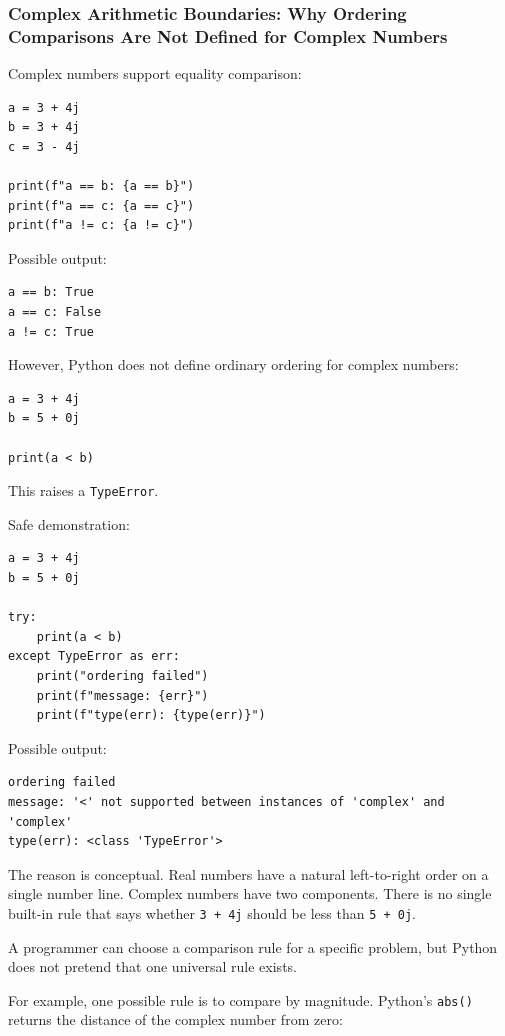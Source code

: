 \subsubsection{Complex Arithmetic Boundaries: Why Ordering Comparisons Are Not Defined for Complex Numbers}

Complex numbers support equality comparison:

\begin{verbatim}
a = 3 + 4j
b = 3 + 4j
c = 3 - 4j

print(f"a == b: {a == b}")
print(f"a == c: {a == c}")
print(f"a != c: {a != c}")
\end{verbatim}

Possible output:

\begin{verbatim}
a == b: True
a == c: False
a != c: True
\end{verbatim}

However, Python does not define ordinary ordering for complex numbers:

\begin{verbatim}
a = 3 + 4j
b = 5 + 0j

print(a < b)
\end{verbatim}

This raises a \texttt{TypeError}.

Safe demonstration:

\begin{verbatim}
a = 3 + 4j
b = 5 + 0j

try:
    print(a < b)
except TypeError as err:
    print("ordering failed")
    print(f"message: {err}")
    print(f"type(err): {type(err)}")
\end{verbatim}

Possible output:

\begin{verbatim}
ordering failed
message: '<' not supported between instances of 'complex' and 'complex'
type(err): <class 'TypeError'>
\end{verbatim}

The reason is conceptual. Real numbers have a natural left-to-right order on a single number line. Complex numbers have two components. There is no single built-in rule that says whether \texttt{3 + 4j} should be less than \texttt{5 + 0j}.

A programmer can choose a comparison rule for a specific problem, but Python does not pretend that one universal rule exists.

For example, one possible rule is to compare by magnitude. Python's \texttt{abs()} returns the distance of the complex number from zero:

